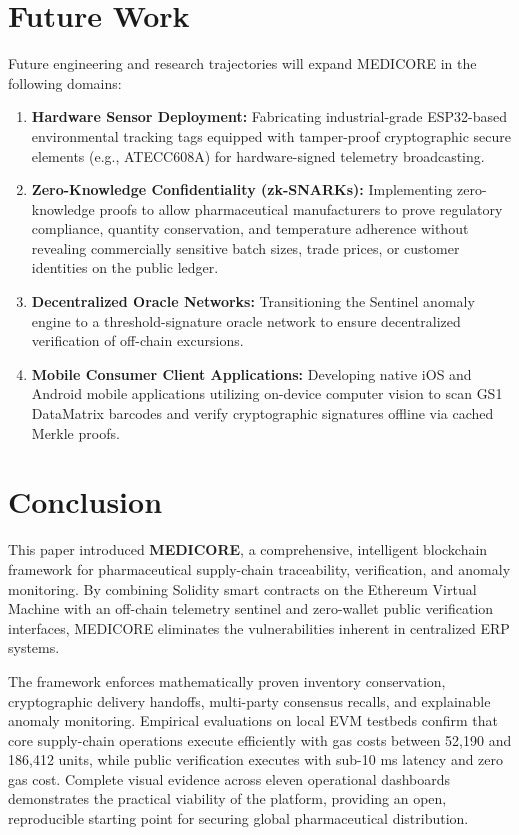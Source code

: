 \documentclass[pdflatex,sn-mathphys-num]{sn-jnl}
\theoremstyle{thmstyleone}
\theoremstyle{thmstyletwo}
\theoremstyle{thmstylethree}
\begin{document}
\section{Future Work}\label{sec:future-work}

Future engineering and research trajectories will expand MEDICORE in the following domains:
\begin{enumerate}
    \item \textbf{Hardware Sensor Deployment:} Fabricating industrial-grade ESP32-based environmental tracking tags equipped with tamper-proof cryptographic secure elements (e.g., ATECC608A) for hardware-signed telemetry broadcasting.
    \item \textbf{Zero-Knowledge Confidentiality (zk-SNARKs):} Implementing zero-knowledge proofs to allow pharmaceutical manufacturers to prove regulatory compliance, quantity conservation, and temperature adherence without revealing commercially sensitive batch sizes, trade prices, or customer identities on the public ledger.
    \item \textbf{Decentralized Oracle Networks:} Transitioning the Sentinel anomaly engine to a threshold-signature oracle network to ensure decentralized verification of off-chain excursions.
    \item \textbf{Mobile Consumer Client Applications:} Developing native iOS and Android mobile applications utilizing on-device computer vision to scan GS1 DataMatrix barcodes and verify cryptographic signatures offline via cached Merkle proofs.
\end{enumerate}


\section{Conclusion}\label{sec:conclusion}

This paper introduced \textbf{MEDICORE}, a comprehensive, intelligent blockchain framework for pharmaceutical supply-chain traceability, verification, and anomaly monitoring. By combining Solidity smart contracts on the Ethereum Virtual Machine with an off-chain telemetry sentinel and zero-wallet public verification interfaces, MEDICORE eliminates the vulnerabilities inherent in centralized ERP systems.

The framework enforces mathematically proven inventory conservation, cryptographic delivery handoffs, multi-party consensus recalls, and explainable anomaly monitoring. Empirical evaluations on local EVM testbeds confirm that core supply-chain operations execute efficiently with gas costs between 52,190 and 186,412 units, while public verification executes with sub-10 ms latency and zero gas cost. Complete visual evidence across eleven operational dashboards demonstrates the practical viability of the platform, providing an open, reproducible starting point for securing global pharmaceutical distribution.
\end{document}
